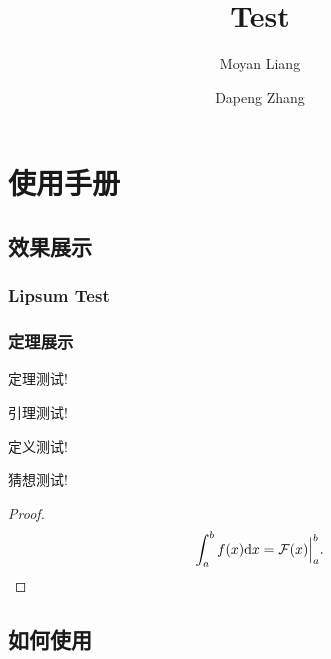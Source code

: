 \documentclass{inkbook}
\title{Test}
\author{Moyan Liang \and Dapeng Zhang}
\begin{document}
    \maketitle
    \tableofcontents
    \part{使用手册}
    \chapter{效果展示}
    \section{Lipsum Test}
    \lipsum[1-20]
    \section{定理展示}
    \begin{theorem}
        定理测试!
    \end{theorem}
    \begin{lemma}
        引理测试!
    \end{lemma}
    \begin{definition}
        定义测试!
    \end{definition}
    \begin{conjecture}
        猜想测试!
    \end{conjecture}
    \begin{proof}
        \begin{equation}
        \int_a^b f(x)\mathrm{d} x =\mathcal{F}(x)\Big|_a^b. 
    \end{equation}
    \end{proof}
    \chapter{如何使用}
    
\end{document}
